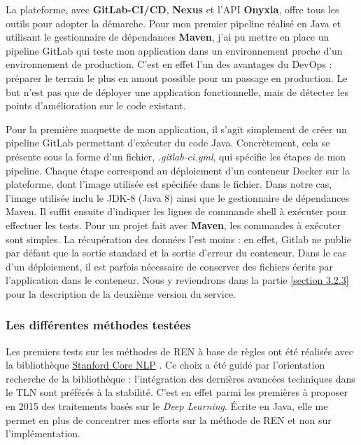 La plateforme, avec \textbf{GitLab-CI/CD}, \textbf{Nexus} et l'API \textbf{Onyxia}, offre tous les outils pour adopter la démarche. Pour mon premier pipeline réalisé en Java et utilisant le gestionnaire de dépendances \textbf{Maven}, j'ai pu mettre en place un pipeline GitLab qui teste mon application dans un environnement proche d'un environnement de production. C'est en effet l'un des avantages du DevOps : préparer le terrain le plus en amont possible pour un passage en production. Le but n'est pas que de déployer une application fonctionnelle, mais de détecter les points d'amélioration sur le code existant. 
\newline

Pour la première maquette de mon application, il s'agit simplement de créer un pipeline GitLab permettant d'exécuter du code Java. Concrètement, cela se présente sous la forme d'un fichier, \textit{.gitlab-ci.yml}, qui spécifie les étapes de mon pipeline. Chaque étape correspond au déploiement d'un conteneur Docker sur la plateforme, dont l'image utilisée est spécifiée dans le fichier. Dans notre cas, l'image utilisée inclu le JDK-8 (Java 8) ainsi que le gestionnaire de dépendances Maven. Il suffit ensuite d'indiquer les lignes de commande shell à exécuter pour effectuer les tests. Pour un projet fait avec \textbf{Maven}, les commandes à exécuter sont simples. La récupération des données l'est moins : en effet, Gitlab ne publie par défaut que la sortie standard et la sortie d'erreur du conteneur. Dans le cas d'un déploiement, il est parfois nécessaire de conserver des fichiers écrits par l'application dans le conteneur. Nous y reviendrons dans la partie \ref{section 3.2.3} pour la description de la deuxième version du service.
\label{section 2.2.3}

\subsubsection{Les différentes méthodes testées}
Les premiers tests sur les méthodes de REN à base de règles ont été réalisés avec la bibliothèque \href{https://stanfordnlp.github.io/CoreNLP/}{Stanford Core NLP} \cite{corenlp-doc}. Ce choix a été guidé par l'orientation recherche de la bibliothèque : l'intégration des dernières avancées techniques dans le TLN sont préférés à la stabilité. C'est en effet parmi les premières à proposer en 2015 des traitements basés sur le \textit{Deep Learning}. Écrite en Java, elle me permet en plus de concentrer mes efforts sur la méthode de REN et non sur l'implémentation. 
\newline

